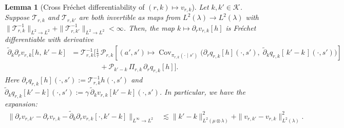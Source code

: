 \documentclass[11pt]{article}
\newcommand{\adk}{\widetilde{\partial}_k}
\theoremstyle{plain}
\newtheorem{lemma}[theorem]{Lemma}
\begin{document}
\begin{lemma}[Cross Fréchet differentiability of $(r,k) \mapsto v_{r,k}$]
\label{lemma::valuederivsecond::kernel}
Let $k, k' \in \mathcal{K}$. Suppose $\mathcal{T}_{r,k}$ and $\mathcal{T}_{r,k'}$ are both invertible as maps from $L^2(\lambda) \to L^2(\lambda)$ with $\|\mathcal{T}_{r,k}^{-1}\|_{L^2 \rightarrow L^2} + \|\mathcal{T}_{r,k'}^{-1}\|_{L^2 \rightarrow L^2} < \infty$. Then, the map  $k \mapsto \partial_r v_{r,k}[h]$ is Fréchet differentiable with derivative
\[
\begin{aligned}
\adk\partial_r v_{r,k}\big[\,h,\,k'-k\,\big]
&= \mathcal{T}_{r,k}^{-1}\Bigg[
\frac{1}{\tau}\,\mathcal{P}_{r,k}\!\left[(a',s')\mapsto
\operatorname{Cov}_{\pi_{r,k}(\cdot\mid s')}\!\Big(
\partial_r q_{r,k}[h](\cdot,s'),\; \adk q_{r,k}[\,k'-k\,](\cdot,s')
\Big)\right] \\
&\qquad\qquad
+ \mathcal{P}_{k'-k}\,\Pi_{r,k}\,\partial_r q_{r,k}[h]
\Bigg].
\end{aligned}
\]
Here $\partial_r q_{r,k}[h](\cdot,s') := \mathcal{T}_{r,k}^{-1}h(\cdot,s')$ and $\adk q_{r,k}[k'-k](\cdot,s') := \gamma\,\adk v_{r,k}[k'-k](\cdot,s')$.
In particular, we have the expansion:
\begin{align*}
 \|\partial_r v_{r,k'} - \partial_r v_{r,k} -  \adk \partial_r v_{r,k}[\cdot, k' - k]  \|_{L^\infty \rightarrow L^2}
 &\lesssim  \|k'-k\|_{L^2(\mu\otimes\lambda)}^2
      + \|v_{r,k'}-v_{r,k}\|_{L^2(\lambda)}^2 .
\end{align*}
 
\end{lemma}
\end{document}
